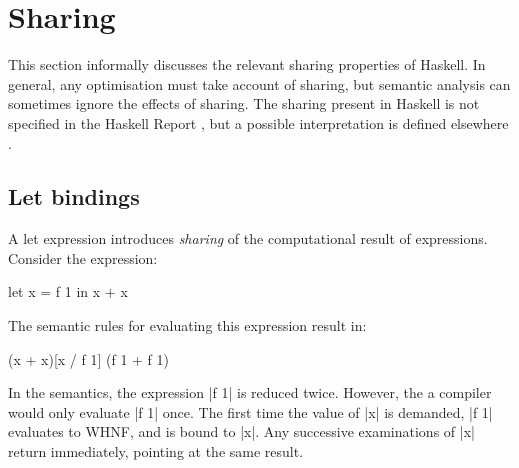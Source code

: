 \section{Sharing}
\label{secB:sharing}

This section informally discusses the relevant sharing properties of Haskell. In general, any optimisation must take account of sharing, but semantic analysis can sometimes ignore the effects of sharing. The sharing present in Haskell is not specified in the Haskell Report \cite{haskell}, but a possible interpretation is defined elsewhere \cite{bakewell:space_semantics}.

\subsection{Let bindings}

A let expression introduces \textit{sharing} of the computational result of expressions. Consider the expression:

\begin{example}
\ignore\begin{code}
let x = f 1
in x + x
\end{code}

The semantic rules for evaluating this expression result in:

\ignore\begin{code}
(x + x)[x / f 1]
(f 1 + f 1)
\end{code}

In the semantics, the expression |f 1| is reduced twice. However, the a compiler would only evaluate |f 1| once. The first time the value of |x| is demanded, |f 1| evaluates to WHNF, and is bound to |x|. Any successive examinations of |x| return immediately, pointing at the same result.
\end{example}



